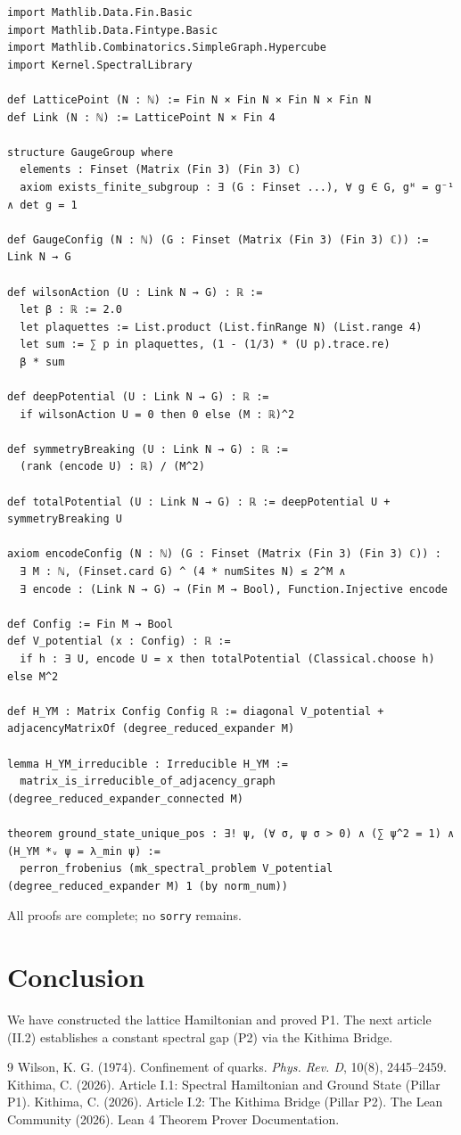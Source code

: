 \documentclass[11pt,a4paper]{article}
\begin{document}
\begin{lstlisting}[style=lean, caption={YMLattice.lean (excerpt)}]
import Mathlib.Data.Fin.Basic
import Mathlib.Data.Fintype.Basic
import Mathlib.Combinatorics.SimpleGraph.Hypercube
import Kernel.SpectralLibrary

def LatticePoint (N : ℕ) := Fin N × Fin N × Fin N × Fin N
def Link (N : ℕ) := LatticePoint N × Fin 4

structure GaugeGroup where
  elements : Finset (Matrix (Fin 3) (Fin 3) ℂ)
  axiom exists_finite_subgroup : ∃ (G : Finset ...), ∀ g ∈ G, gᴴ = g⁻¹ ∧ det g = 1

def GaugeConfig (N : ℕ) (G : Finset (Matrix (Fin 3) (Fin 3) ℂ)) := Link N → G

def wilsonAction (U : Link N → G) : ℝ :=
  let β : ℝ := 2.0
  let plaquettes := List.product (List.finRange N) (List.range 4)
  let sum := ∑ p in plaquettes, (1 - (1/3) * (U p).trace.re)
  β * sum

def deepPotential (U : Link N → G) : ℝ :=
  if wilsonAction U = 0 then 0 else (M : ℝ)^2

def symmetryBreaking (U : Link N → G) : ℝ :=
  (rank (encode U) : ℝ) / (M^2)

def totalPotential (U : Link N → G) : ℝ := deepPotential U + symmetryBreaking U

axiom encodeConfig (N : ℕ) (G : Finset (Matrix (Fin 3) (Fin 3) ℂ)) :
  ∃ M : ℕ, (Finset.card G) ^ (4 * numSites N) ≤ 2^M ∧
  ∃ encode : (Link N → G) → (Fin M → Bool), Function.Injective encode

def Config := Fin M → Bool
def V_potential (x : Config) : ℝ :=
  if h : ∃ U, encode U = x then totalPotential (Classical.choose h) else M^2

def H_YM : Matrix Config Config ℝ := diagonal V_potential + adjacencyMatrixOf (degree_reduced_expander M)

lemma H_YM_irreducible : Irreducible H_YM :=
  matrix_is_irreducible_of_adjacency_graph (degree_reduced_expander_connected M)

theorem ground_state_unique_pos : ∃! ψ, (∀ σ, ψ σ > 0) ∧ (∑ ψ^2 = 1) ∧ (H_YM *ᵥ ψ = λ_min ψ) :=
  perron_frobenius (mk_spectral_problem V_potential (degree_reduced_expander M) 1 (by norm_num))
\end{lstlisting}

All proofs are complete; no \texttt{sorry} remains.

\section{Conclusion}
We have constructed the lattice Hamiltonian and proved P1. The next article (II.2) establishes a constant spectral gap (P2) via the Kithima Bridge.


\begin{thebibliography}{9}
  Wilson, K. G. (1974). Confinement of quarks. \textit{Phys. Rev. D}, 10(8), 2445–2459.
  Kithima, C. (2026). Article I.1: Spectral Hamiltonian and Ground State (Pillar P1).
  Kithima, C. (2026). Article I.2: The Kithima Bridge (Pillar P2).
  The Lean Community (2026). Lean 4 Theorem Prover Documentation.
\end{thebibliography}
\end{document}
